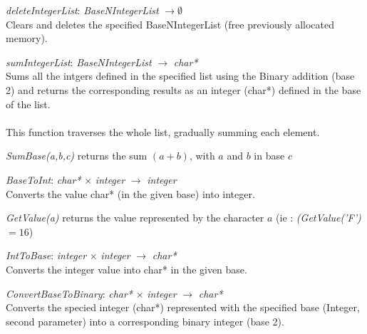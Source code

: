 \documentclass[book, backcover, english, nodocumentinfo]{upmethodology-document}
\begin{document}
		\begin{minipage}{\linewidth}
			\textit{deleteIntegerList}: \textit{BaseNIntegerList} $\rightarrow \emptyset$\\
			Clears and deletes the specified BaseNIntegerList (free previously allocated memory).\\
			\label{algo:BNIL-DeleteIntegerList}
			
		\end{minipage}
		\nxtalgo{}

		\begin{minipage}{\linewidth}
			\textit{sumIntegerList}: \textit{BaseNIntegerList} $\rightarrow$ \textit{char*}\\
			Sums all the intgers defined in the specified list using the Binary addition (base 2) and returns the corresponding results as an integer (char*) defined in the base of the list.\\
			\ov\\
			This function traverses the whole list, gradually summing each element.
			\label{algo:BNIL-SumIntegerList}
			
			\textit{SumBase(a,b,c)} returns the sum $(a+b)$, with $a$ and $b$ in base $c$
		\end{minipage}
		\nxtalgo{}

		\begin{minipage}{\linewidth}
			\textit{BaseToInt}: \textit{char*} $\times$ \textit{integer} $\rightarrow$ \textit{integer}\\
			Converts the value char* (in the given base) into integer.
			\label{algo:BNIL-BaseToInt}
			
			\textit{GetValue(a)} returns the value represented by the character $a$
			(ie : \textit{(GetValue('F')} $= 16$)
		\end{minipage}
		\nxtalgo{}

		\begin{minipage}{\linewidth}
			\textit{IntToBase}: \textit{integer} $\times$ \textit{integer} $\rightarrow$ \textit{char*}\\
			Converts the integer value into char* in the given base.
			\label{algo:BNIL-IntToBase}
			
		\end{minipage}
		\nxtalgo{}

		\begin{minipage}{\linewidth}
			\textit{ConvertBaseToBinary}: \textit{char*} $\times$ \textit{integer} $\rightarrow$ \textit{char*}\\
			Converts the specied integer (char*) represented with the specified base (Integer, second parameter) into a corresponding binary integer (base 2).
			\label{algo:BNIL-ConvertBaseToBinary}
			
		\end{minipage}
		\nxtalgo{}
\end{document}
